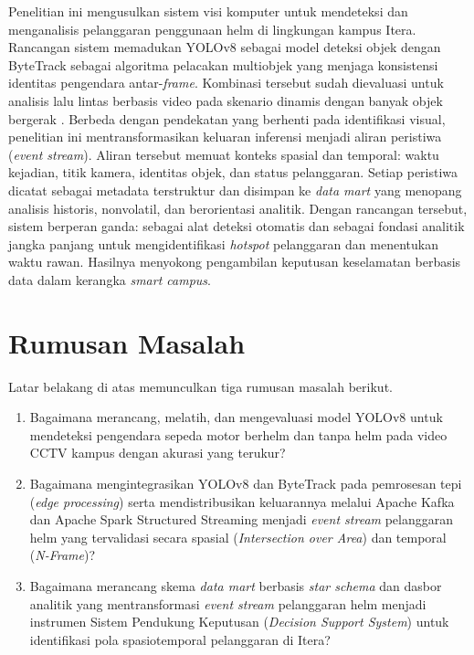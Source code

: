 Penelitian ini mengusulkan sistem visi komputer untuk mendeteksi dan menganalisis pelanggaran penggunaan helm di lingkungan kampus Itera. Rancangan sistem memadukan YOLOv8 sebagai model deteksi objek dengan ByteTrack sebagai algoritma pelacakan multiobjek yang menjaga konsistensi identitas pengendara antar-\textit{frame}. Kombinasi tersebut sudah dievaluasi untuk analisis lalu lintas berbasis video pada skenario dinamis dengan banyak objek bergerak \cite{liu2025vehicle}. Berbeda dengan pendekatan yang berhenti pada identifikasi visual, penelitian ini mentransformasikan keluaran inferensi menjadi aliran peristiwa (\textit{event stream}). Aliran tersebut memuat konteks spasial dan temporal: waktu kejadian, titik kamera, identitas objek, dan status pelanggaran. Setiap peristiwa dicatat sebagai metadata terstruktur dan disimpan ke \textit{data mart} yang menopang analisis historis, nonvolatil, dan berorientasi analitik. Dengan rancangan tersebut, sistem berperan ganda: sebagai alat deteksi otomatis dan sebagai fondasi analitik jangka panjang untuk mengidentifikasi \textit{hotspot} pelanggaran dan menentukan waktu rawan. Hasilnya menyokong pengambilan keputusan keselamatan berbasis data dalam kerangka \textit{smart campus}.

\section{Rumusan Masalah}
\label{section:rumusanmasalah}

Latar belakang di atas memunculkan tiga rumusan masalah berikut.

\begin{enumerate}
  \item Bagaimana merancang, melatih, dan mengevaluasi model YOLOv8 untuk mendeteksi pengendara sepeda motor berhelm dan tanpa helm pada video CCTV kampus dengan akurasi yang terukur?

  \item Bagaimana mengintegrasikan YOLOv8 dan ByteTrack pada pemrosesan tepi (\textit{edge processing}) serta mendistribusikan keluarannya melalui Apache Kafka dan Apache Spark Structured Streaming menjadi \textit{event stream} pelanggaran helm yang tervalidasi secara spasial (\textit{Intersection over Area}) dan temporal (\textit{N-Frame})?

  \item Bagaimana merancang skema \textit{data mart} berbasis \textit{star schema} dan dasbor analitik yang mentransformasi \textit{event stream} pelanggaran helm menjadi instrumen Sistem Pendukung Keputusan (\textit{Decision Support System}) untuk identifikasi pola spasiotemporal pelanggaran di Itera?
\end{enumerate}


